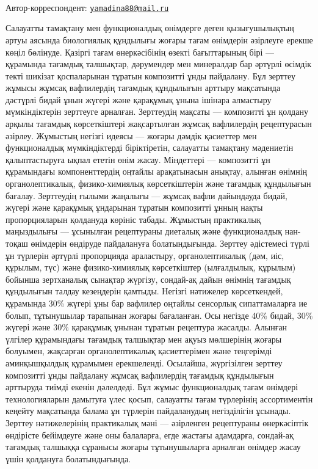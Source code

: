 {\bfseries \textsuperscript{\envelope }}Автор-корреспондент:
\href{mailto:yamadina88@mail.ru}{\nolinkurl{yamadina88@mail.ru}}

Салауатты тамақтану мен функционалдық өнімдерге деген қызығушылықтың
артуы аясында биологиялық құндылығы жоғары тағам өнімдерін әзірлеуге
ерекше көңіл бөлінуде. Қазіргі тағам өнеркәсібінің өзекті бағыттарының
бірі --- құрамында тағамдық талшықтар, дәрумендер мен минералдар бар
әртүрлі өсімдік текті шикізат қоспаларынан тұратын композитті ұнды
пайдалану. Бұл зерттеу жұмысы жұмсақ вафлилердің тағамдық құндылығын
арттыру мақсатында дәстүрлі бидай ұнын жүгері және қарақұмық ұнына
ішінара алмастыру мүмкіндіктерін зерттеуге арналған. Зерттеудің мақсаты
--- композитті ұн қолдану арқылы тағамдық көрсеткіштері жақсартылған
жұмсақ вафлилердің рецептурасын әзірлеу. Жұмыстың негізгі идеясы ---
жоғары дәмдік қасиеттер мен функционалдық мүмкіндіктерді біріктіретін,
салауатты тамақтану мәдениетін қалыптастыруға ықпал ететін өнім жасау.
Міндеттері --- композитті ұн құрамындағы компоненттердің оңтайлы
арақатынасын анықтау, алынған өнімнің органолептикалық, физико-химиялық
көрсеткіштерін және тағамдық құндылығын бағалау. Зерттеудің ғылыми
жаңалығы --- жұмсақ вафли дайындауда бидай, жүгері және қарақұмық
ұндарынан тұратын композитті ұнның нақты пропорцияларын қолдануда
көрініс табады. Жұмыстың практикалық маңыздылығы --- ұсынылған
рецептураны диеталық және функционалдық нан-тоқаш өнімдерін өндіруде
пайдалануға болатындығында. Зерттеу әдістемесі түрлі ұн түрлерін әртүрлі
пропорцияда араластыру, органолептикалық (дәм, иіс, құрылым, түс) және
физико-химиялық көрсеткіштер (ылғалдылық, құрылым) бойынша зертханалық
сынақтар жүргізу, сондай-ақ дайын өнімнің тағамдық құндылығын талдау
кезеңдерін қамтыды. Негізгі нәтижелер көрсеткендей, құрамында 30\%
жүгері ұны бар вафлилер оңтайлы сенсорлық сипаттамаларға ие болып,
тұтынушылар тарапынан жоғары бағаланған. Осы негізде 40\% бидай, 30\%
жүгері және 30\% қарақұмық ұнынан тұратын рецептура жасалды. Алынған
үлгілер құрамындағы тағамдық талшықтар мен ақуыз мөлшерінің жоғары
болуымен, жақсарған органолептикалық қасиеттерімен және теңгерімді
аминқышқылдық құрамымен ерекшеленді. Осылайша, жүргізілген зерттеу
композитті ұнды пайдалану жұмсақ вафлилердің тағамдық құндылығын
арттыруда тиімді екенін дәлелдеді. Бұл жұмыс функционалдық тағам
өнімдері технологияларын дамытуға үлес қосып, салауатты тағам түрлерінің
ассортиментін кеңейту мақсатында балама ұн түрлерін пайдаланудың
негізділігін ұсынады. Зерттеу нәтижелерінің практикалық мәні ---
әзірленген рецептураны өнеркәсіптік өндірісте бейімдеуге және оны
балаларға, егде жастағы адамдарға, сондай-ақ тағамдық талшыққа сұранысы
жоғары тұтынушыларға арналған өнімдер жасау үшін қолдануға
болатындығында.


